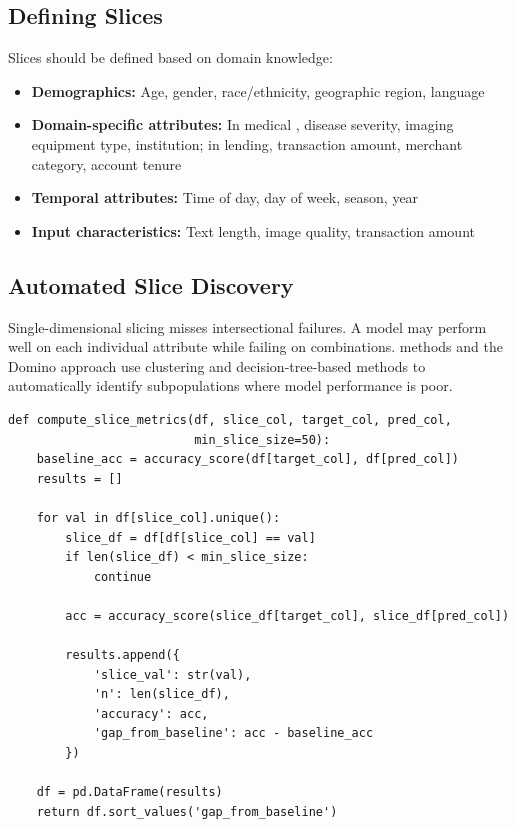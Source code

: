 \subsection{Defining Slices}

Slices should be defined based on domain knowledge:
\begin{itemize}
    \item \textbf{Demographics:} Age, gender, race/ethnicity, geographic region, language
    \item \textbf{Domain-specific attributes:} In medical \ai, disease severity, imaging equipment type, institution; in lending, transaction amount, merchant category, account tenure
    \item \textbf{Temporal attributes:} Time of day, day of week, season, year
    \item \textbf{Input characteristics:} Text length, image quality, transaction amount
\end{itemize}

\subsection{Automated Slice Discovery}

Single-dimensional slicing misses intersectional failures. A model may perform well on each individual attribute while failing on combinations.  methods \autocite{chung2019slicefinder} and the Domino approach \autocite{eyuboglu2022domino} use clustering and decision-tree-based methods to automatically identify subpopulations where model performance is poor.

\begin{lstlisting}[style=python, caption={Slice-based evaluation core implementation}]
def compute_slice_metrics(df, slice_col, target_col, pred_col,
                          min_slice_size=50):
    baseline_acc = accuracy_score(df[target_col], df[pred_col])
    results = []

    for val in df[slice_col].unique():
        slice_df = df[df[slice_col] == val]
        if len(slice_df) < min_slice_size:
            continue

        acc = accuracy_score(slice_df[target_col], slice_df[pred_col])

        results.append({
            'slice_val': str(val),
            'n': len(slice_df),
            'accuracy': acc,
            'gap_from_baseline': acc - baseline_acc
        })

    df = pd.DataFrame(results)
    return df.sort_values('gap_from_baseline')
\end{lstlisting}

